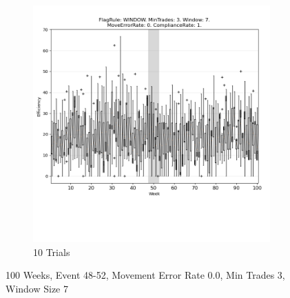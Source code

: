 \documentclass{article}%
\begin{document}
\begin{figure}[!htb]
\begin{subfigure}[b]{0.45\linewidth}
\includegraphics[clip,width=\linewidth,trim=0 4cm 0 0]{0055fr_WINDOW_mt_3_ws_7_er_0_cr_1_t10.png}%
\caption{10 Trials}%
\end{subfigure}%
\caption{100 Weeks, Event 48{-}52, Movement Error Rate 0.0, Min Trades 3, Window Size 7}%
\end{figure}

%
\end{document}
